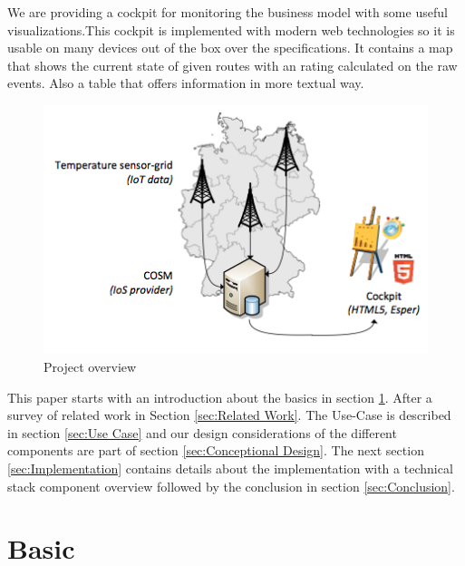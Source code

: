 \documentclass{acm_proc_article-sp}
\begin{document}
We are providing a cockpit for monitoring the business model with some useful visualizations.This cockpit is implemented with modern web technologies so it is usable on many devices out of the box over the specifications. It contains a map that shows the current state of given routes with an rating calculated on the raw events. Also a table that offers information in more textual way.

\begin{figure}[h]
	\begin{center}
		\includegraphics[scale=0.5]{overview.png}
		\caption[Project overview]{Project overview}
		\label{fig:Project overview}
	\end{center}
\end{figure}

This paper starts with an introduction about the basics in section \ref{sec:Basics}.
After a survey of related work in Section \ref{sec:Related Work}. 
The Use-Case is described in section \ref{sec:Use Case} and our design considerations of the different components are part of section \ref{sec:Conceptional Design}.
The next section \ref{sec:Implementation} contains details about the implementation with a technical stack component overview followed by the conclusion in section \ref{sec:Conclusion}.

\section{Basic}
\label{sec:Basics}
\end{document}
